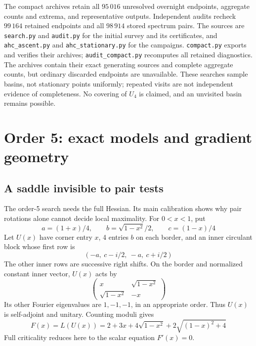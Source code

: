 \documentclass[11pt,a4paper]{article}
\begin{document}
The compact archives retain all $95\,016$ unresolved overnight endpoints,
aggregate counts and extrema, and representative outputs. Independent
audits recheck $99\,164$ retained endpoints and all $98\,914$ stored
spectrum pairs. The sources are \texttt{search.py} and \texttt{audit.py} for the initial
survey and its certificates, and \texttt{ahc\_ascent.py} and
\texttt{ahc\_stationary.py} for the campaigns. \texttt{compact.py}
exports and verifies their archives; \texttt{audit\_compact.py}
recomputes all retained diagnostics. The archives contain their exact
generating sources and complete aggregate counts, but ordinary discarded
endpoints are unavailable.
These searches sample basins, not stationary points uniformly; repeated
visits are not independent evidence of completeness. No covering of
$U_4$ is claimed, and an unvisited basin remains possible.

\section{Order 5: exact models and gradient geometry}\label{fivegeometry}
\subsection{A saddle invisible to pair tests}
The order-5 search needs the full Hessian. Its main calibration
shows why pair rotations alone cannot decide local maximality.
For $0<x<1$, put
\[
 a=(1+x)/4,\qquad b=\sqrt{1-x^2}/2,\qquad c=(1-x)/4
\]
Let $U(x)$ have corner entry $x$, 4 entries $b$ on each border, and
an inner circulant block whose first row is
\[
 (-a,\ c-i/2,\ -a,\ c+i/2)
\]
The other inner rows are successive right shifts. On the border and
normalized constant inner vector, $U(x)$ acts by
\[
 \begin{pmatrix}x&\sqrt{1-x^2}\\\sqrt{1-x^2}&-x\end{pmatrix}
\]
Its other Fourier eigenvalues are $1,-1,-1$, in an appropriate order.
Thus $U(x)$ is self-adjoint and unitary. Counting moduli gives
\[
 F(x)=L(U(x))=2+3x+4\sqrt{1-x^2}+2\sqrt{(1-x)^2+4}
\]
Full criticality reduces here to the scalar equation $F'(x)=0$.
\end{document}

